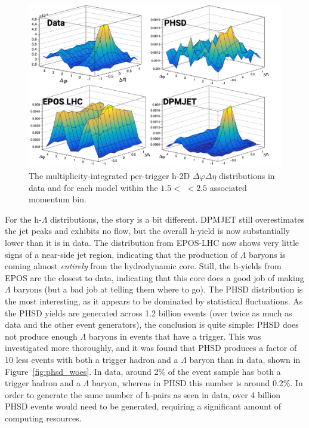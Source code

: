 \begin{figure}[ht]
\centering
\includegraphics[width=\textwidth]{figures/results/h_lambda_2d_modelcomp.png}
\caption{The multiplicity-integrated per-trigger h-\lmb 2D $\Delta\varphi\Delta\eta$ distributions in data and for each model within the $1.5 <$ \pt $< 2.5$ \GeVc associated momentum bin.}
\label{fig:h_lambda_2d_model}
\end{figure}

For the h-$\Lambda$ distributions, the story is a bit different. DPMJET still overestimates the jet peaks and exhibits no flow, but the overall h-\lmb yield is now substantially lower than it is in data. The distribution from EPOS-LHC now shows very little signs of a near-side jet region, indicating that the production of $\Lambda$ baryons is coming almost \textit{entirely} from the hydrodynamic core. Still, the h-\lmb yields from EPOS are the closest to data, indicating that this core does a good job of making $\Lambda$ baryons (but a bad job at telling them where to go). The PHSD distribution is the most interesting, as it appears to be dominated by statistical fluctuations. As the PHSD yields are generated across 1.2 billion events (over twice as much as data and the other event generators), the conclusion is quite simple: PHSD does not produce enough $\Lambda$ baryons in events that have a trigger. This was investigated more thoroughly, and it was found that PHSD produces a factor of 10 less events with both a trigger hadron and a $\Lambda$ baryon than in data, shown in Figure~\ref{fig:phsd_woes}. In data, around 2\% of the event sample has both a trigger hadron and a $\Lambda$ baryon, whereas in PHSD this number is around 0.2\%. In order to generate the same number of h-\lmb pairs as seen in data, over 4 billion PHSD events would need to be generated, requiring a significant amount of computing resources.

